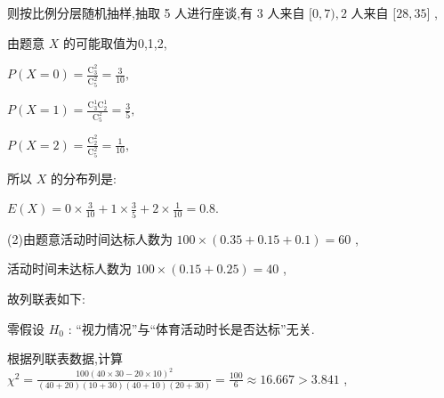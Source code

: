 \documentclass[10pt]{article}
\begin{document}
则按比例分层随机抽样,抽取 5 人进行座谈,有 3 人来自 \(\lbrack 0,7),2\) 人来自 \(\lbrack {28},{35}\rbrack\) ,

由题意 \(X\) 的可能取值为0,1,2,

\(P\left( {X = 0}\right)  = \frac{{\mathrm{C}}_{3}^{2}}{{\mathrm{C}}_{5}^{2}} = \frac{3}{10},\)

\(P\left( {X = 1}\right)  = \frac{{\mathrm{C}}_{3}^{1}{\mathrm{C}}_{2}^{1}}{{\mathrm{C}}_{5}^{2}} = \frac{3}{5},\)

\(P\left( {X = 2}\right)  = \frac{{\mathrm{C}}_{2}^{2}}{{\mathrm{C}}_{5}^{2}} = \frac{1}{10},\)

所以 \(X\) 的分布列是:

\begin{center}
\end{center}

\(E\left( X\right)  = 0 \times  \frac{3}{10} + 1 \times  \frac{3}{5} + 2 \times  \frac{1}{10} = {0.8}.\)

(2)由题意活动时间达标人数为 \({100} \times  \left( {{0.35} + {0.15} + {0.1}}\right)  = {60}\) ,

活动时间未达标人数为 \({100} \times  \left( {{0.15} + {0.25}}\right)  = {40}\) ,

故列联表如下:

\begin{center}
\end{center}

零假设 \({H}_{0}\) : “视力情况”与“体育活动时长是否达标”无关.

根据列联表数据,计算 \({\chi }^{2} = \frac{{100}{\left( {40} \times  {30} - {20} \times  {10}\right) }^{2}}{\left( {{40} + {20}}\right) \left( {{10} + {30}}\right) \left( {{40} + {10}}\right) \left( {{20} + {30}}\right) } = \frac{100}{6} \approx  {16.667} > {3.841}\) ,
\end{document}
